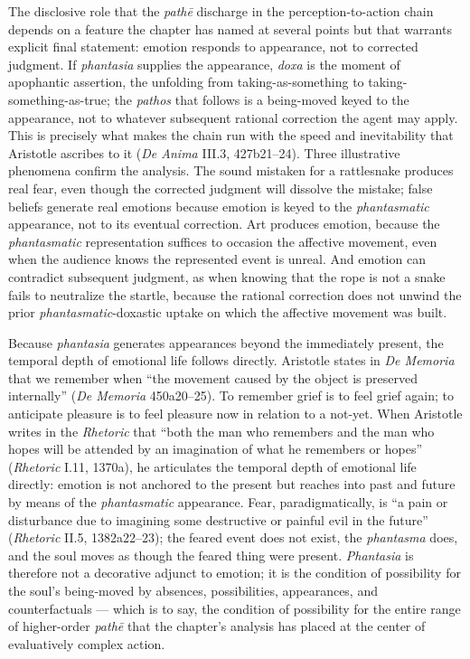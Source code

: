 The disclosive role that the \textit{pathē} discharge in the perception-to-action chain depends on a feature the chapter has named at several points but that warrants explicit final statement: emotion responds to appearance, not to corrected judgment. If \textit{phantasia} supplies the appearance, \textit{doxa} is the moment of apophantic assertion, the unfolding from taking-as-something to taking-something-as-true; the \textit{pathos} that follows is a being-moved keyed to the appearance, not to whatever subsequent rational correction the agent may apply. This is precisely what makes the chain run with the speed and inevitability that Aristotle ascribes to it (\textit{De Anima} III.3, 427b21--24). Three illustrative phenomena confirm the analysis. The sound mistaken for a rattlesnake produces real fear, even though the corrected judgment will dissolve the mistake; false beliefs generate real emotions because emotion is keyed to the \textit{phantasmatic} appearance, not to its eventual correction. Art produces emotion, because the \textit{phantasmatic} representation suffices to occasion the affective movement, even when the audience knows the represented event is unreal. And emotion can contradict subsequent judgment, as when knowing that the rope is not a snake fails to neutralize the startle, because the rational correction does not unwind the prior \textit{phantasmatic}-doxastic uptake on which the affective movement was built.

Because \textit{phantasia} generates appearances beyond the immediately present, the temporal depth of emotional life follows directly. Aristotle states in \textit{De Memoria} that we remember when ``the movement caused by the object is preserved internally'' (\textit{De Memoria} 450a20--25). To remember grief is to feel grief again; to anticipate pleasure is to feel pleasure now in relation to a not-yet. When Aristotle writes in the \textit{Rhetoric} that ``both the man who remembers and the man who hopes will be attended by an imagination of what he remembers or hopes'' (\textit{Rhetoric} I.11, 1370a), he articulates the temporal depth of emotional life directly: emotion is not anchored to the present but reaches into past and future by means of the \textit{phantasmatic} appearance. Fear, paradigmatically, is ``a pain or disturbance due to imagining some destructive or painful evil in the future'' (\textit{Rhetoric} II.5, 1382a22--23); the feared event does not exist, the \textit{phantasma} does, and the soul moves as though the feared thing were present. \textit{Phantasia} is therefore not a decorative adjunct to emotion; it is the condition of possibility for the soul's being-moved by absences, possibilities, appearances, and counterfactuals --- which is to say, the condition of possibility for the entire range of higher-order \textit{pathē} that the chapter's analysis has placed at the center of evaluatively complex action.

